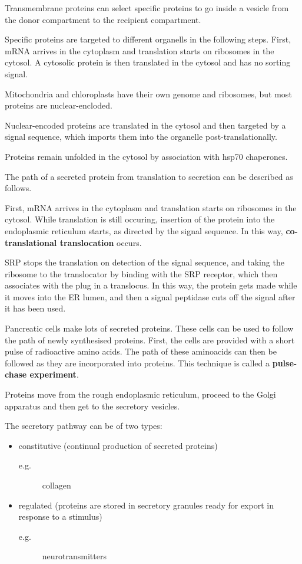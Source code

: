 \documentclass[11pt]{scrartcl}
\begin{document}
Transmembrane proteins can select specific proteins to go inside a
vesicle from the donor compartment to the recipient compartment.

Specific proteins are targeted to different organells in the following
steps. First, mRNA arrives in the cytoplasm and translation starts on
ribosomes in the cytosol. A cytosolic protein is then translated in
the cytosol and has no sorting signal.

Mitochondria and chloroplasts have their own genome and ribosomes, but
most proteins are nuclear-encloded.

Nuclear-encoded proteins are translated in the cytosol and then
targeted by a signal sequence, which imports them into the organelle post-translationally.

Proteins remain unfolded in the cytosol by association with hsp70
chaperones.

The path of a secreted protein from translation to secretion can be described as follows.

First, mRNA arrives in the cytoplasm and translation starts on
ribosomes in the cytosol. While translation is still occuring,
insertion of the protein into the endoplasmic reticulum starts, as
directed by the signal sequence. In this way, \textbf{co-translational
  translocation} occurs.

SRP stops the translation on detection of the signal sequence, and
taking the ribosome to the translocator by binding with the SRP
receptor, which then associates with the plug in a translocus. In this
way, the protein gets made while it moves into the ER lumen, and then
a signal peptidase cuts off the signal after it has been used.

Pancreatic cells make lots of secreted proteins. These cells can be
used to follow the path of newly synthesised proteins. First, the
cells are provided with a short pulse of radioactive amino acids. The
path of these aminoacids can then be followed as they are incorporated
into proteins. This technique is called a \textbf{pulse-chase
  experiment}.

Proteins move from the rough endoplasmic reticulum, proceed to the
Golgi apparatus and then get to the secretory vesicles.

The secretory pathway can be of two types:
\begin{itemize}
\item constitutive (continual production of secreted proteins)
  \begin{description}

  \item[e.g.] collagen

  \end{description}
  
\item regulated (proteins are stored in secretory granules ready for export in response to a stimulus)
  \begin{description}

  \item[e.g.] neurotransmitters

  \end{description}
\end{itemize}
\end{document}
